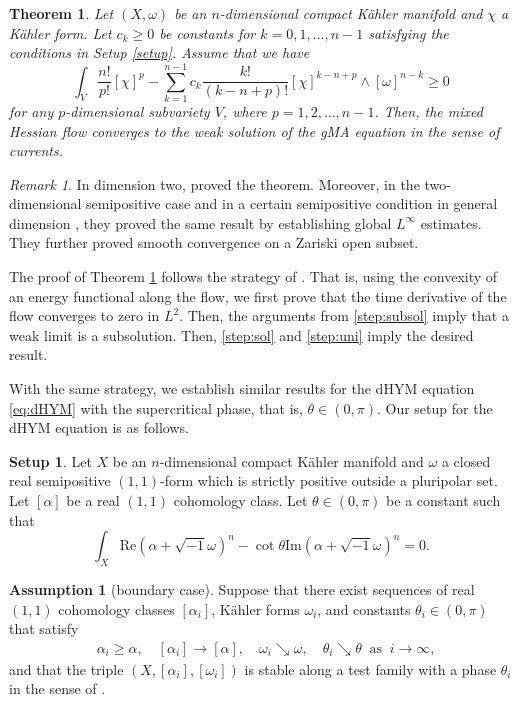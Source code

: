 \documentclass{amsart}
\numberwithin{equation}{section}
\theoremstyle{plain}
\newtheorem{thm}[equation]{Theorem}
\theoremstyle{definition}
\newtheorem{setup}[equation]{Setup}
\newtheorem{asmp}[equation]{Assumption}
\theoremstyle{remark}
\newtheorem{remark}[equation]{Remark}
\begin{document}
\begin{thm}\label{thm:Hessflow}
    Let $(X,\omega)$ be an $n$-dimensional compact Kähler manifold and $\chi$ a Kähler form. Let $c_k\ge0$ be constants for $k=0,1,\dots,n-1$ satisfying the conditions in Setup \ref{setup}.  Assume that we have
    $$\int_V\frac{n!}{p!}[\chi]^p-\sum_{k=1}^{n-1}c_k\frac{k!}{(k-n+p)!}[\chi]^{k-n+p}\wedge[\omega]^{n-k}\ge0$$
    for any $p$-dimensional subvariety $V$, where $p=1,2,\dots,{n-1}$.
    Then, the mixed Hessian flow converges to the weak solution of the gMA equation in the sense of currents.
\end{thm}

\begin{remark}
    In dimension two, \cite{Mur} proved the theorem. Moreover, in the two-dimensional semipositive case \cite{FLSW} and in a certain semipositive condition in general dimension \cite{Sun23b}, they proved the same result by establishing global $L^\infty$ estimates. They further proved smooth convergence on a Zariski open subset.
\end{remark}
The proof of Theorem \ref{thm:Hessflow} follows the strategy of \cite{Mur}. That is, using the convexity of an energy functional along the flow, we first prove that the time derivative of the flow converges to zero in $L^2$. Then, the arguments from \ref{step:subsol} imply that a weak limit is a subsolution. Then, \ref{step:sol} and \ref{step:uni} imply the desired result.

With the same strategy, we establish similar results for the dHYM equation \eqref{eq:dHYM} with the supercritical phase, that is, $\theta\in(0,\pi)$. Our setup for the dHYM equation is as follows. 

\begin{setup}\label{setup2}
    Let $X$ be an $n$-dimensional compact Kähler manifold and $\omega$ a closed real semipositive $(1,1)$-form which is strictly positive outside a pluripolar set. Let $[\alpha]$ be a real $(1,1)$ cohomology class. Let $\theta\in(0,\pi)$ be a constant such that 
    \begin{equation*}
        \int_X \mathrm{Re}(\alpha+\sqrt{-1}\omega)^n-\cot\theta\mathrm{Im}(\alpha+\sqrt{-1}\omega)^n=0.
    \end{equation*}
\end{setup}
\begin{asmp}[boundary case]\label{asmp:bdrydHYM}
    Suppose that there exist sequences of real $(1,1)$ cohomology classes $[\alpha_i]$, Kähler forms $\omega_i$, and constants $\theta_i\in(0,\pi)$ that satisfy
    \begin{align}
    &\alpha_i\ge\alpha, \quad [\alpha_i]\to[\alpha],\quad \omega_i\searrow \omega,\quad \theta_i\searrow\theta\ \text{ as }\ i\to\infty,
    \end{align}
    and that the triple $(X,[\alpha_i],[\omega_i])$ is stable along a test family with a phase $\theta_i$ in the sense of \cite[Theorem 1.3]{CLT}.
\end{asmp}
\end{document}
